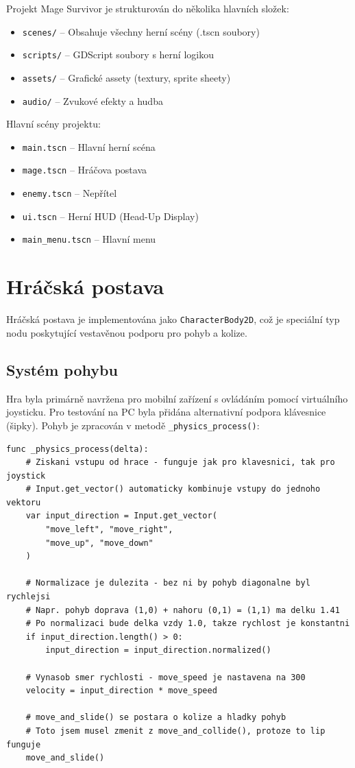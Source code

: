 \documentclass[12pt, a4paper,
oneside
]{report}
\begin{document}
	Projekt Mage Survivor je strukturován do několika hlavních složek:
	\nopagebreak
	\begin{itemize}
		\item \texttt{scenes/} -- Obsahuje všechny herní scény (.tscn soubory)
		\item \texttt{scripts/} -- GDScript soubory s herní logikou
		\item \texttt{assets/} -- Grafické assety (textury, sprite sheety)
		\item \texttt{audio/} -- Zvukové efekty a hudba
	\end{itemize}
	
	Hlavní scény projektu:
	\begin{itemize}
		\item \texttt{main.tscn} -- Hlavní herní scéna
		\item \texttt{mage.tscn} -- Hráčova postava
		\item \texttt{enemy.tscn} -- Nepřítel
		\item \texttt{ui.tscn} -- Herní HUD (Head-Up Display)
		\item \texttt{main\_menu.tscn} -- Hlavní menu
	\end{itemize}
	
	\section{Hráčská postava}
	\nopagebreak
	
	Hráčská postava je implementována jako \texttt{CharacterBody2D}, což je speciální typ nodu poskytující vestavěnou podporu pro pohyb a kolize.
	\nopagebreak
	
	\subsection{Systém pohybu}
	\nopagebreak
	
	Hra byla primárně navržena pro mobilní zařízení s ovládáním pomocí virtuálního joysticku. Pro testování na PC byla přidána alternativní podpora klávesnice (šipky). Pohyb je zpracován v metodě \texttt{\_physics\_process()}:
	\nopagebreak
	
\begin{lstlisting}[style=GDScript, caption={Implementace pohybu hráče}]
func _physics_process(delta):
	# Ziskani vstupu od hrace - funguje jak pro klavesnici, tak pro joystick
	# Input.get_vector() automaticky kombinuje vstupy do jednoho vektoru
	var input_direction = Input.get_vector(
		"move_left", "move_right",
		"move_up", "move_down"
	)
	
	# Normalizace je dulezita - bez ni by pohyb diagonalne byl rychlejsi
	# Napr. pohyb doprava (1,0) + nahoru (0,1) = (1,1) ma delku 1.41
	# Po normalizaci bude delka vzdy 1.0, takze rychlost je konstantni
	if input_direction.length() > 0:
		input_direction = input_direction.normalized()
	
	# Vynasob smer rychlosti - move_speed je nastavena na 300
	velocity = input_direction * move_speed
	
	# move_and_slide() se postara o kolize a hladky pohyb
	# Toto jsem musel zmenit z move_and_collide(), protoze to lip funguje
	move_and_slide()
\end{lstlisting}
\end{document}

